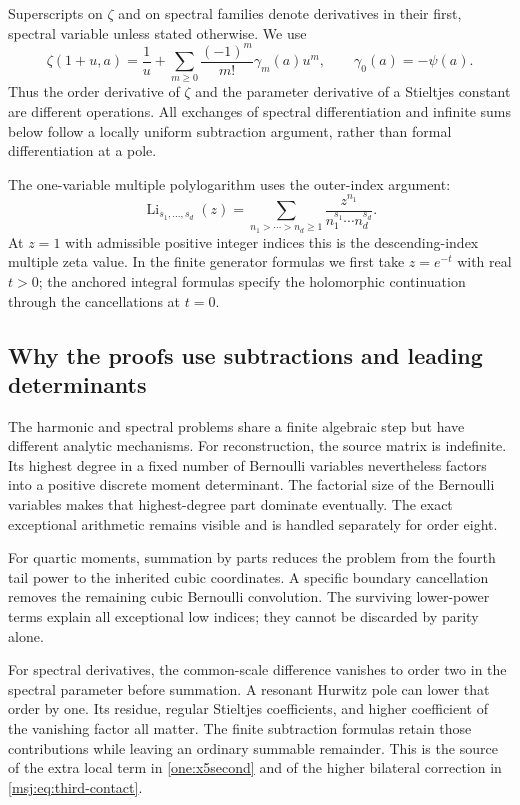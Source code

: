\documentclass[11pt,a4paper]{article}
\numberwithin{equation}{section}
\theoremstyle{plain}
\theoremstyle{definition}
\theoremstyle{remark}
\DeclareMathOperator{\Li}{Li}
\begin{document}
Superscripts on $\zeta$ and on spectral families denote derivatives
in their first, spectral variable unless stated otherwise.  We use
\[
 \zeta(1+u,a)=\frac1u+
       \sum_{m\ge0}\frac{(-1)^m}{m!}\gamma_m(a)u^m,
 \qquad \gamma_0(a)=-\psi(a).
\]
Thus the order derivative of $\zeta$ and the parameter derivative of a
Stieltjes constant are different operations.  All exchanges of spectral
differentiation and infinite sums below follow a locally uniform
subtraction argument, rather than formal differentiation at a pole.

The one-variable multiple polylogarithm uses the outer-index argument:
\[
 \Li_{s_1,\ldots,s_d}(z)=
 \sum_{n_1>\cdots>n_d\ge1}
       \frac{z^{n_1}}{n_1^{s_1}\cdots n_d^{s_d}}.
\]
At $z=1$ with admissible positive integer indices this is the
descending-index multiple zeta value.  In the finite generator formulas
we first take $z=e^{-t}$ with real $t>0$; the anchored integral formulas
specify the holomorphic continuation through the cancellations at $t=0$.

\subsection{Why the proofs use subtractions and leading determinants}

The harmonic and spectral problems share a finite algebraic step but have
different analytic mechanisms.  For reconstruction, the source matrix is
indefinite.  Its highest degree in a fixed number of Bernoulli variables
nevertheless factors into a positive discrete moment determinant.  The
factorial size of the Bernoulli variables makes that highest-degree part
dominate eventually.  The exact exceptional arithmetic remains visible
and is handled separately for order eight.

For quartic moments, summation by parts reduces the problem from the
fourth tail power to the inherited cubic coordinates.  A specific
boundary cancellation removes the remaining cubic Bernoulli convolution.
The surviving lower-power terms explain all exceptional low indices;
they cannot be discarded by parity alone.

For spectral derivatives, the common-scale difference vanishes to order
two in the spectral parameter before summation.  A resonant Hurwitz
pole can lower that order by one.  Its residue, regular Stieltjes
coefficients, and higher coefficient of the vanishing factor all matter.
The finite subtraction formulas retain those contributions while leaving
an ordinary summable remainder.  This is the source of the extra local
term in \eqref{one:x5second} and of the higher bilateral correction in
\eqref{msj:eq:third-contact}.
\end{document}
